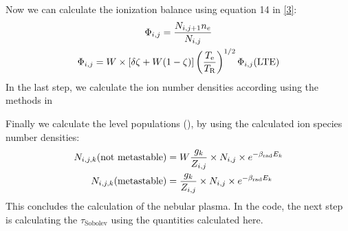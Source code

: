 \documentclass[letterpaper,10pt,english]{sphinxmanual}
\begin{document}
Now we can calculate the ionization balance using equation 14 in {\hyperref[zreferences:a-a-279-447m]{{[}3{]}}}:
\begin{gather}
\begin{split}\Phi_{i,j} &= \frac{N_{i, j+1} n_e}{N_{i, j}} \\\end{split}\notag\\\begin{split}\Phi_{i, j} &= W \times[\delta \zeta + W ( 1 - \zeta)] \left(\frac{T_\textrm{e}}{T_\textrm{R}}\right)^{1/2}
\Phi_{i, j}(\textrm{LTE}) \\\end{split}\notag
\end{gather}
In the last step, we calculate the ion number densities according using the methods in 

Finally we calculate the level populations (),
by using the calculated ion species number densities:
\begin{gather}
\begin{split}N_{i, j, k}(\textrm{not metastable}) &= W\frac{g_k}{Z_{i, j}}\times N_{i, j} \times e^{-\beta_\textrm{rad} E_k} \\
N_{i, j, k}(\textrm{metastable}) &= \frac{g_k}{Z_{i, j}}\times N_{i, j} \times e^{-\beta_\textrm{rad} E_k} \\\end{split}\notag
\end{gather}
This concludes the calculation of the nebular plasma. In the code, the next step is calculating the $\tau_\textrm{Sobolev}$ using
the quantities calculated here.
\end{document}
